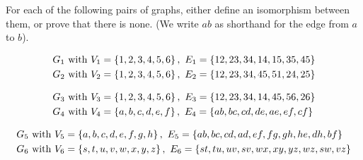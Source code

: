 \documentclass[12pt,twoside]{article}
\begin{document}
\begin{problem}{15}
For each of the following pairs of graphs, either define an isomorphism
between them, or prove that there is none.  (We write $ab$ as shorthand
for the edge from $a$ to $b$).

\bparts

\begin{align*}
G_1\text{ with }& V_1 = \left\{1,2,3,4,5,6\right\},\ E_1= \left\{12,23,34,14,15,35,45\right\}\\
G_2\text{ with }& V_2 = \left\{1,2,3,4,5,6\right\},\ E_2= \left\{12,23,34,45,51,24,25\right\}
\end{align*}


\begin{align*}
G_3\text{ with } &V_3 = \left\{1,2,3,4,5,6\right\},\ E_3= \left\{12,23,34,14,45,56,26\right\}\\
G_4\text{ with } &V_4 = \left\{a,b,c,d,e,f\right\},\ E_4= \left\{ab,bc,cd,de,ae,ef,cf\right\}
\end{align*}


\begin{align*}
G_5\text{ with } & V_5 = \set{a,b,c,d,e,f,g,h},\ E_5= \set{ab,bc,cd,ad,ef,fg,gh,he,dh,bf}\\
G_6\text{ with } & V_6 = \set{s,t,u,v,w,x,y,z},\ E_6=\set{st,tu,uv,sv,wx,xy,yz,wz,sw,vz}
\end{align*}


\eparts

\end{problem}
\end{document}
